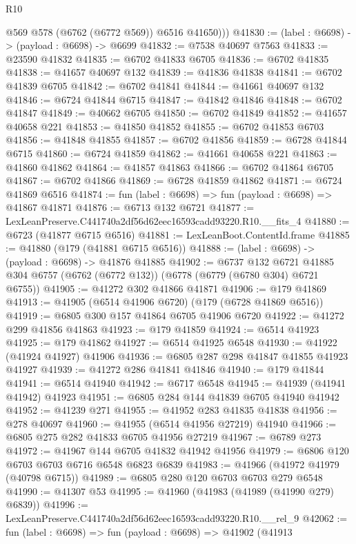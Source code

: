 \begin{lexlean}{R10}
\begin{coremodule}
          @569
          @578
          (@6762 (@6772 @569))
          @6516
          @41650)))
@41830 := (label : @6698) -> (payload : @6698) -> @6699
@41832 := @7538 @40697 @7563
@41833 := @23590 @41832
@41835 := @6702 @41833 @6705
@41836 := @6702 @41835
@41838 := @41657 @40697 @132
@41839 := @41836 @41838
@41841 := @6702 @41839 @6705
@41842 := @6702 @41841
@41844 := @41661 @40697 @132
@41846 := @6724 @41844 @6715
@41847 := @41842 @41846
@41848 := @6702 @41847
@41849 := @40662 @6705
@41850 := @6702 @41849
@41852 := @41657 @40658 @221
@41853 := @41850 @41852
@41855 := @6702 @41853 @6703
@41856 := @41848 @41855
@41857 := @6702 @41856
@41859 := @6728 @41844 @6715
@41860 := @6724 @41859
@41862 := @41661 @40658 @221
@41863 := @41860 @41862
@41864 := @41857 @41863
@41866 := @6702 @41864 @6705
@41867 := @6702 @41866
@41869 := @6728 @41859 @41862
@41871 := @6724 @41869 @6516
@41874 := fun (label : @6698) => fun (payload : @6698) => @41867 @41871
@41876 := @6713 @132 @6721
@41877 := LexLeanPreserve.C441740a2df56d62eec16593cadd93220.R10.__fits_4
@41880 := @6723 (@41877 @6715 @6516)
@41881 := LexLeanBoot.ContentId.frame
@41885 := @41880 (@179 (@41881 @6715 @6516))
@41888 := (label : @6698) -> (payload : @6698) -> @41876 @41885
@41902 := @6737
    @132
    @6721
    @41885
    @304
    @6757
    (@6762 (@6772 @132))
    (@6778 (@6779 (@6780 @304) @6721 @6755))
@41905 := @41272 @302 @41866 @41871
@41906 := @179 @41869
@41913 := @41905 (@6514 @41906 @6720) (@179 (@6728 @41869 @6516))
@41919 := @6805 @300 @157 @41864 @6705 @41906 @6720
@41922 := @41272 @299 @41856 @41863
@41923 := @179 @41859
@41924 := @6514 @41923
@41925 := @179 @41862
@41927 := @6514 @41925 @6548
@41930 := @41922 (@41924 @41927) @41906
@41936 := @6805 @287 @298 @41847 @41855 @41923 @41927
@41939 := @41272 @286 @41841 @41846
@41940 := @179 @41844
@41941 := @6514 @41940
@41942 := @6717 @6548
@41945 := @41939 (@41941 @41942) @41923
@41951 := @6805 @284 @144 @41839 @6705 @41940 @41942
@41952 := @41239 @271
@41955 := @41952 @283 @41835 @41838
@41956 := @278 @40697
@41960 := @41955 (@6514 @41956 @27219) @41940
@41966 := @6805 @275 @282 @41833 @6705 @41956 @27219
@41967 := @6789 @273
@41972 := @41967 @144 @6705 @41832 @41942 @41956
@41979 := @6806 @120 @6703 @6703 @6716 @6548 @6823 @6839
@41983 := @41966 (@41972 @41979 (@40798 @6715))
@41989 := @6805 @280 @120 @6703 @6703 @279 @6548
@41990 := @41307 @53
@41995 := @41960 (@41983 (@41989 (@41990 @279) @6839))
@41996 := LexLeanPreserve.C441740a2df56d62eec16593cadd93220.R10.__rel_9
@42062 := fun (label : @6698) =>
  fun (payload : @6698) =>
  @41902
    (@41913

\end{coremodule}
\end{lexlean}
